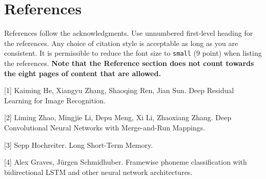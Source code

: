 \documentclass{article}
\begin{document}
\section*{References}

References follow the acknowledgments. Use unnumbered first-level heading for
the references. Any choice of citation style is acceptable as long as you are
consistent. It is permissible to reduce the font size to \verb+small+ (9 point)
when listing the references.
{\bf Note that the Reference section does not count towards the eight pages of content that are allowed.}
\medskip

\small

[1] Kaiming He, Xiangyu Zhang, Shaoqing Ren, Jian Sun. Deep Residual Learning for Image Recognition.

[2] Liming Zhao, Mingjie Li, Depu Meng, Xi Li, Zhaoxiang Zhang. Deep Convolutional Neural Networks with Merge-and-Run Mappings.

[3] Sepp Hochreiter. Long Short-Term Memory. 

[4] Alex Graves, Jürgen Schmidhuber. Framewise phoneme classification with bidirectional LSTM and other neural network architectures. 
\end{document}
